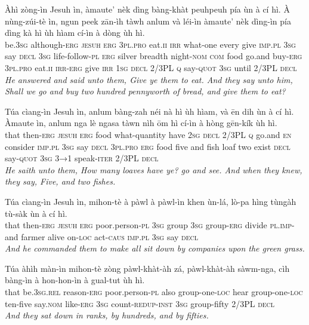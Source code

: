 \documentclass[11pt,a4paper]{article}
\begin{document}
\begin{exe}
\gll Àhì zòng-ìn Jesuh ìn, àmaute' nèk dìng bàng-khàt peuhpeuh pía ùn à cí hì. À nùng-zúi-tè ìn, ngun peek zān-ìh tàwh anlum và léi-ìn àmaute' nèk dìng-ìn pía dìng kà hì ùh hìam cí-ìn à dòng ùh hì. \\
     be.\textsc{3sg} although-\textsc{erg} \textsc{jesuh} \textsc{erg} \textsc{3pl}.\textsc{pro} eat.\textsc{ii} \textsc{irr} what-one every give \textsc{imp}.\textsc{pl} \textsc{3sg} say \textsc{decl} \textsc{3sg} life-follow-\textsc{pl} \textsc{erg} silver breadth night-\textsc{nom} \textsc{com} food go.and buy-\textsc{erg} \textsc{3pl}.\textsc{pro} eat.\textsc{ii} \textsc{irr}-\textsc{erg} give \textsc{irr} \textsc{1sg} \textsc{decl} 2/3PL \textsc{q} say-\textsc{quot} \textsc{3sg} until 2/3PL \textsc{decl} \\
\glt \textcolor{kjvcolor}{\textit{He answered and said unto them, Give ye them to eat. And they say unto him, Shall we go and buy two hundred pennyworth of bread, and give them to eat?}}

\gll Túa cìang-ìn Jesuh ìn, anlum bàng-zah néi nà hì ùh hìam, và ēn dih ùn à cí hì. Àmaute ìn, anlum nga lè ngasa tàwn nìh ōm hì cí-ìn à hòng gēn-kík ùh hì. \\
     that then-\textsc{erg} \textsc{jesuh} \textsc{erg} food what-quantity have \textsc{2sg} \textsc{decl} 2/3PL \textsc{q} go.and \textsc{en} consider \textsc{imp}.\textsc{pl} \textsc{3sg} say \textsc{decl} \textsc{3pl}.\textsc{pro} \textsc{erg} food five and fish loaf two exist \textsc{decl} say-\textsc{quot} \textsc{3sg} \textsc{3→1} speak-\textsc{iter} 2/3PL \textsc{decl} \\
\glt \textcolor{kjvcolor}{\textit{He saith unto them, How many loaves have ye? go and see. And when they knew, they say, Five, and two fishes.}}

\gll Túa cìang-ìn Jesuh ìn, mihon-tè à pàwl à pàwl-ìn khen ùn-lá, lò-pa hìng tùngàh tù-sàk ùn à cí hì. \\
     that then-\textsc{erg} \textsc{jesuh} \textsc{erg} poor.person-\textsc{pl} \textsc{3sg} group \textsc{3sg} group-\textsc{erg} divide \textsc{pl}.\textsc{imp}-and farmer alive on-\textsc{loc} act-\textsc{caus} \textsc{imp}.\textsc{pl} \textsc{3sg} say \textsc{decl} \\
\glt \textcolor{kjvcolor}{\textit{And he commanded them to make all sit down by companies upon the green grass.}}

\gll Túa àhìh màn-ìn mihon-tè zòng pàwl-khàt-àh zá, pàwl-khàt-àh sàwm-nga, cìh bàng-ìn à hon-hon-ìn à gual-tut ùh hì. \\
     that be.\textsc{3sg}.\textsc{rel} reason-\textsc{erg} poor.person-\textsc{pl} also group-one-\textsc{loc} hear group-one-\textsc{loc} ten-five say.\textsc{nom} like-\textsc{erg} \textsc{3sg} count-\textsc{redup}-\textsc{inst} \textsc{3sg} group-fifty 2/3PL \textsc{decl} \\
\glt \textcolor{kjvcolor}{\textit{And they sat down in ranks, by hundreds, and by fifties.}}


\end{exe}
\end{document}
